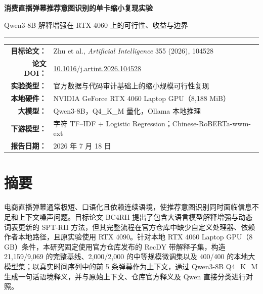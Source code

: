 \documentclass[UTF8,zihao=-4,a4paper]{ctexart}
\begin{document}
\begin{titlepage}
  \centering
  \vspace*{1.4cm}
  {\bfseries 消费直播弹幕推荐意图识别的单卡缩小复现实验\par}
  \vspace{0.55cm}
  {\color{DeepBlue} Qwen3-8B 解释增强在 RTX 4060 上的可行性、收益与边界\par}
  \vspace{1.1cm}
  \rule{0.78\textwidth}{0.7pt}
  \vspace{1.1cm}

  \begin{tabular}{>{\bfseries}rl}
    目标论文： & Zhu et al., \textit{Artificial Intelligence} 355 (2026), 104528 \\
    论文 DOI： & \href{https://doi.org/10.1016/j.artint.2026.104528}{10.1016/j.artint.2026.104528} \\
    实验类型： & 官方数据与代码审计基础上的缩小规模可行性复现 \\
    本地硬件： & NVIDIA GeForce RTX 4060 Laptop GPU（8,188 MiB） \\
    大模型： & Qwen3-8B，Q4\_K\_M 量化，Ollama 本地推理 \\
    下游模型： & 字符 TF--IDF + Logistic Regression；Chinese-RoBERTa-wwm-ext \\
    报告日期： & 2026 年 7 月 18 日 \\
  \end{tabular}


\end{titlepage}

\tableofcontents
\clearpage
{}

\section*{摘要}

电商直播弹幕通常极短、口语化且依赖连续语境，使推荐意图识别同时面临信息不足和上下文噪声问题。目标论文 BC4RII 提出了包含大语言模型解释增强与动态词表更新的 SPT-RII 方法\cite{zhu2026bc4rii}，但其完整流程在官方仓库中缺少自定义处理器、依赖作者本地路径，且原实验使用 RTX 4090。针对本地 RTX 4060 Laptop GPU（8 GB）条件，本研究固定使用官方仓库发布的 RecDY 带解释子集，构造 21,159/9,069 的完整基线、2,000/2,000 的中等规模微调集以及 400/400 的本地大模型集；以真实时间序列中的前 5 条弹幕作为上下文，通过 Qwen3-8B Q4\_K\_M 生成一句话语境释义，并与原始上下文、仓库官方释义及 Qwen 直接分类进行对照。
\end{document}
